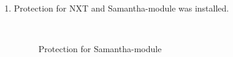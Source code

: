 \begin{enumerate}
\begin{enumerate}
		\item Protection for NXT and Samantha-module was installed.
		\begin{figure}[H]
		  \begin{minipage}[h]{0.2\linewidth}
			\center  
		  \end{minipage}
		  \begin{minipage}[h]{0.6\linewidth}
			\caption{Protection for Samantha-module}
		  \end{minipage}
	    \end{figure}
		

\end{enumerate}
\end{enumerate}
